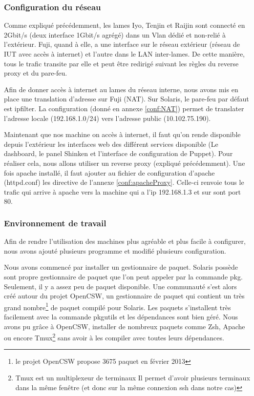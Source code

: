 \documentclass[a4paper,oneside]{report}
\begin{document}
\subsubsection{Configuration du réseau}
Comme expliqué précédemment, les lames Iyo, Tenjin et Raijin sont connecté en 2Gbit/s (deux interface 1Gbit/s agrégé) dans un Vlan dédié et non-relié à l'extérieur.
Fuji, quand à elle, a une interface sur le réseau extérieur (réseau de IUT avec accès à internet) et l'autre dans le LAN inter-lames.
De cette manière, tous le trafic transite par elle et peut être redirigé suivant les règles du reverse proxy et du pare-feu. 

Afin de donner accès à internet au lames du réseau interne, nous avons mis en place une translation d'adresse sur Fuji (NAT).
Sur Solaris, le pare-feu par défaut est ipfilter. La configuration (donné en annexe \ref{conf:NAT}) permet de translater l'adresse locale (192.168.1.0/24) vers l'adresse public (10.102.75.190).

Maintenant que nos machine on accès à internet, il faut qu'on rende disponible depuis l'extérieur les interfaces web des différent services disponible (Le dashboard, le panel Shinken et l'interface de configuration de Puppet).
Pour réaliser cela, nous allons utiliser un reverse proxy (expliqué précédemment). Une fois apache installé, il faut ajouter au fichier de configuration d'apache (httpd.conf) les directive de l'annexe \ref{conf:apacheProxy}.
Celle-ci renvoie tous le trafic qui arrive à apache vers la machine qui a l'ip 192.168.1.3 et sur sont port 80.

\subsubsection{Environnement de travail}
Afin de rendre l'utilisation des machines plus agréable et plus facile à configurer, nous avons ajouté plusieurs programme et modifié plusieurs configuration.

Nous avons commencé par installer un gestionnaire de paquet.
Solaris possède sont propre gestionnaire de paquet que l'on peut appeler par la commande pkg. Seulement, il y a assez peu de paquet disponible.
Une communauté s'est alors créé autour du projet OpenCSW, un gestionnaire de paquet qui contient un très grand nombre\footnote{le projet OpenCSW propose 3675 paquet en février 2013} de paquet compilé pour Solaris.
Les paquets s'installent très facilement avec la commande pkgutils et les dépendances sont bien géré. Nous avons pu grâce à OpenCSW, installer de nombreux paquets comme Zsh, Apache ou encore Tmux\footnote{Tmux est un multiplexeur de terminaux
Il permet d'avoir plusieurs terminaux dans la même fenêtre (et donc sur la même connexion \gls{ssh} dans notre cas)} sans avoir à les compiler avec toutes leurs dépendances. 
\end{document}
